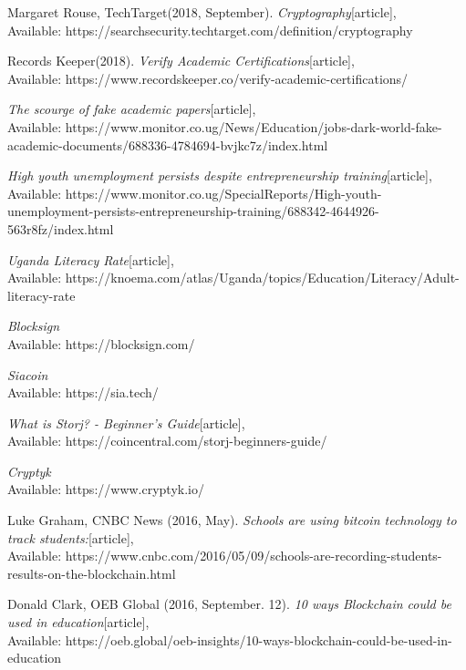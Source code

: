 \begin{thebibliography}{14}

Margaret Rouse, TechTarget(2018, September).
\emph{Cryptography}[article],\\
Available: {https://searchsecurity.techtarget.com/definition/cryptography}

 Records Keeper(2018).
\emph{Verify Academic Certifications}[article],\\
Available: {https://www.recordskeeper.co/verify-academic-certifications/}

\emph{The scourge of fake academic papers}[article],\\
Available: {https://www.monitor.co.ug/News/Education/jobs-dark-world-fake-academic-documents/688336-4784694-bvjkc7z/index.html}

\emph{High youth unemployment persists despite entrepreneurship training}[article],\\
Available: {https://www.monitor.co.ug/SpecialReports/High-youth-unemployment-persists-entrepreneurship-training/688342-4644926-563r8fz/index.html}

\emph{Uganda Literacy Rate}[article],\\
Available: {https://knoema.com/atlas/Uganda/topics/Education/Literacy/Adult-literacy-rate}

\emph{Blocksign}\\
Available: {https://blocksign.com/}

\emph{Siacoin}\\
Available: {https://sia.tech/}

\emph{What is Storj? - Beginner’s Guide}[article],\\
Available: {https://coincentral.com/storj-beginners-guide/}

\emph{Cryptyk}\\
Available: {https://www.cryptyk.io/}

Luke Graham, CNBC News (2016, May).
\emph{Schools are using bitcoin technology to track students:}[article],\\
Available: {https://www.cnbc.com/2016/05/09/schools-are-recording-students-results-on-the-blockchain.html}

Donald Clark, OEB Global (2016, September. 12).
\emph{10 ways Blockchain could be used in education}[article],\\
Available: {https://oeb.global/oeb-insights/10-ways-blockchain-could-be-used-in-education}


\end{thebibliography}
